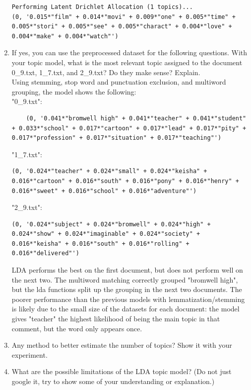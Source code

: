 \documentclass[conference]{IEEEtran}
\begin{document}
\begin{enumerate}
\begin{lstlisting}
Performing Latent Drichlet Allocation (1 topics)...
(0, '0.015*"film" + 0.014*"movi" + 0.009*"one" + 0.005*"time" + 0.005*"stori" + 0.005*"see" + 0.005*"charact" + 0.004*"love" + 0.004*"make" + 0.004*"watch"')
\end{lstlisting}
\newpage
    \item If yes, you can use the preprocessed dataset for the following questions. With your topic model, what is the most relevant topic assigned to the document 0\_9.txt, 1\_7.txt, and 2\_9.txt? Do they make sense? Explain.\\
    Using stemming, stop word and punctuation exclusion, and multiword grouping, the model shows the following:\\
"0\_9.txt":
    \begin{lstlisting}
    (0, '0.041*"bromwell high" + 0.041*"teacher" + 0.041*"student" + 0.033*"school" + 0.017*"cartoon" + 0.017*"lead" + 0.017*"pity" + 0.017*"profession" + 0.017*"situation" + 0.017*"teaching"')
    \end{lstlisting}
"1\_7.txt":
\begin{lstlisting}
(0, '0.024*"teacher" + 0.024*"small" + 0.024*"keisha" + 0.016*"cartoon" + 0.016*"south" + 0.016*"pony" + 0.016*"henry" + 0.016*"sweet" + 0.016*"school" + 0.016*"adventure"')
\end{lstlisting}
"2\_9.txt":
    \begin{lstlisting}
(0, '0.024*"subject" + 0.024*"bromwell" + 0.024*"high" + 0.024*"show" + 0.024*"imaginable" + 0.024*"society" + 0.016*"keisha" + 0.016*"south" + 0.016*"rolling" + 0.016*"delivered"')
    \end{lstlisting}
	LDA performs the best on the first document, but does not perform well on the next two. The multiword matching correctly grouped "bromwell high", but the lda functions split up the grouping in the next two documents. The poorer performance than the previous models with lemmatization/stemming is likely due to the small size of the datasets for each document: the model gives "teacher" the highest likelihood of being the main topic in that comment, but the word only appears once.\\
    \item Any method to better estimate the number of topics? Show it with your experiment.\\
    \item What are the possible limitations of the LDA topic model? (Do not just google it, try to show some of your understanding or explanation.)\\

\end{enumerate}
\end{document}

